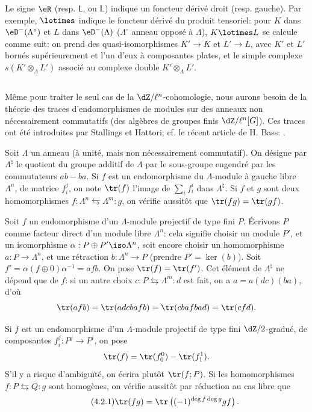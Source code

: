 Le signe $\eR$ (resp. $\mathsf{L}$, ou $\mathbb{L}$) indique un foncteur dérivé droit (resp. 
gauche). Par exemple, $\lotimes$ indique le foncteur dérivé du produit 
tensoriel: pour $K$ dans $\eD^-(\Lambda^\circ)$ et $L$ dans $\eD^-(\Lambda)$ 
($\Lambda^\circ$ anneau opposé à $\Lambda$), $K\lotimes L$ se calcule 
comme suit: on prend des quasi-isomorphismes $K'\to K$ et $L'\to L$, avec 
$K'$ et $L'$ bornés supérieurement et l'un d'eux à composantes plates, et 
le simple complexe $s(K'\otimes_\Lambda L')$ associé au complexe double 
$K'\otimes_\Lambda L'$. 





\subsection{}\label{II:4-2}

Même pour traiter le seul cas de la $\dZ/\ell^n$-cohomologie, nous aurons 
besoin de la théorie des traces d'endomorphismes de modules sur des anneaux 
non nécessairement commutatifs (des algèbres de groupes finis 
$\dZ/\ell^n[G]$). Ces traces ont été introduites par Stallings et Hattori; cf. le récent article de H. Bass: 
\cite{ba76}. 

Soit $\Lambda$ un anneau (à unité, mais non nécessairement commutatif). 
On désigne par $\Lambda^\natural$ le quotient du groupe additif de $\Lambda$ par le 
sous-groupe engendré par les commutateurs $a b - b a$. Si $f$ est un 
endomorphisme du $\Lambda$-module à gauche libre $\Lambda^n$, de matrice 
$f_i^j$, on note $\tr(f)$ l'image de $\sum_i f_i^i$ dans $\Lambda^\natural$. 
Si $f$ et $g$ sont deux homomorphismes 
$f:\Lambda^n \leftrightarrows \Lambda^m : g$, on vérifie aussitôt que 
$\tr(f g) = \tr(g f)$. 

Soit $f$ un endomorphisme d'un $\Lambda$-module projectif de type fini $P$. 
Écrivons $P$ comme facteur direct d'un module libre $\Lambda^n$: cela signifie 
choisir un module $P'$, et un isomorphisme $\alpha:P\oplus P'\iso \Lambda^n$, 
soit encore choisir un homomorphisme $a:P\to \Lambda^n$, et une rétraction 
$b:\Lambda^n\to P$ (prendre $P'=\ker(b)$). Soit 
$f'=\alpha(f\oplus 0)\alpha^{-1} =af b$. On pose $\tr(f) = \tr(f')$. Cet 
élément de $\Lambda^\natural$ ne dépend que de $f$: si un autre choix 
$c:P\leftrightarrows \Lambda^m:d$ est fait, on a $a=a(dc)(ba)$, d'où 
\[
 \tr(a f b) = \tr(adcbafb) = \tr(cbafbad) = \tr(cfd) \text{.}
\]

Si $f$ est un endomorphisme d'un $\Lambda$-module projectif de type fini 
$\dZ/2$-gradué, de composantes $f_i^j:P^j\to P^i$, on pose 
\[
  \tr(f) = \tr(f_0^0) - \tr(f_1^1) \text{.}
\]
S'il y a risque d'ambiguïté, on écrira plutôt $\tr(f;P)$. Si les 
homomorphismes $f:P\leftrightarrows Q:g$ sont homogènes, on vérifie 
aussitôt par réduction au cas libre que 
\begin{equation*}\tag{4.2.1}\label{II:eq:4-2-1}
  \tr(f g) = \tr\left((-1)^{\deg f \deg g} g f\right) \text{.}
\end{equation*}

